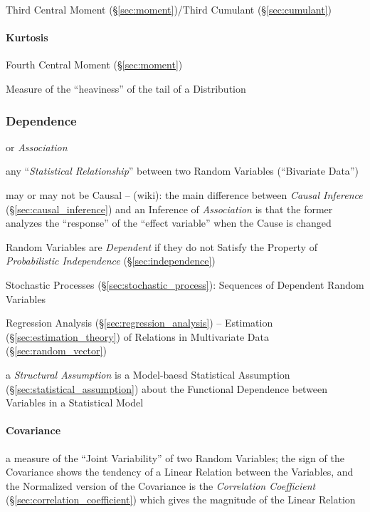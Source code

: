 Third Central Moment (\S\ref{sec:moment})/Third Cumulant (\S\ref{sec:cumulant})



\paragraph{Kurtosis}\label{sec:kurtosis}\hfill

Fourth Central Moment (\S\ref{sec:moment})

Measure of the ``heaviness'' of the tail of a Distribution



\subsubsection{Dependence}\label{sec:dependence}

or \emph{Association}

any ``\emph{Statistical Relationship}'' between two Random Variables
(``Bivariate Data'')

may or may not be Causal -- (wiki): the main difference between
\emph{Causal Inference} (\S\ref{sec:causal_inference}) and an Inference of
\emph{Association} is that the former analyzes the ``response'' of the ``effect
variable'' when the Cause is changed

Random Variables are \emph{Dependent} if they do not Satisfy the Property of
\emph{Probabilistic Independence} (\S\ref{sec:independence})

Stochastic Processes (\S\ref{sec:stochastic_process}): Sequences of Dependent
Random Variables

\fist Regression Analysis (\S\ref{sec:regression_analysis}) -- Estimation
(\S\ref{sec:estimation_theory}) of Relations in Multivariate Data
(\S\ref{sec:random_vector})

\fist a \emph{Structural Assumption} is a Model-baesd Statistical Assumption
(\S\ref{sec:statistical_assumption}) about the Functional Dependence between
Variables in a Statistical Model



\paragraph{Covariance}\label{sec:covariance}\hfill

a measure of the ``Joint Variability'' of two Random Variables; the sign of the
Covariance shows the tendency of a Linear Relation between the Variables, and
the Normalized version of the Covariance is the \emph{Correlation Coefficient}
(\S\ref{sec:correlation_coefficient}) which gives the magnitude of the Linear
Relation

